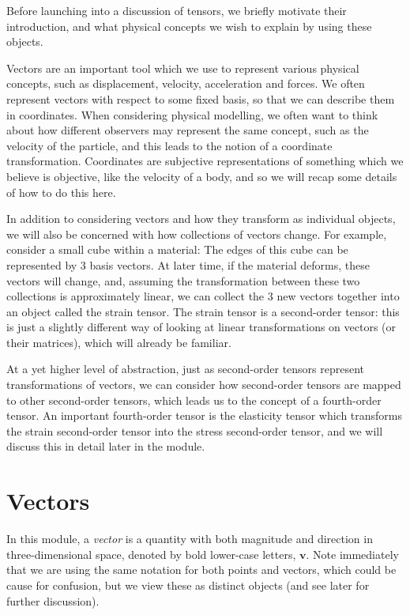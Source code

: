 \documentclass[
  letterpaper,
  DIV=11,
  numbers=noendperiod]{scrreprt}
\theoremstyle{plain}
\theoremstyle{remark}
\begin{document}
Before launching into a discussion of tensors, we briefly motivate their
introduction, and what physical concepts we wish to explain by using
these objects.

Vectors are an important tool which we use to represent various physical
concepts, such as displacement, velocity, acceleration and forces. We
often represent vectors with respect to some fixed basis, so that we can
describe them in coordinates. When considering physical modelling, we
often want to think about how different observers may represent the same
concept, such as the velocity of the particle, and this leads to the
notion of a coordinate transformation. Coordinates are subjective
representations of something which we believe is objective, like the
velocity of a body, and so we will recap some details of how to do this
here.

In addition to considering vectors and how they transform as individual
objects, we will also be concerned with how collections of vectors
change. For example, consider a small cube within a material: The edges
of this cube can be represented by 3 basis vectors. At later time, if
the material deforms, these vectors will change, and, assuming the
transformation between these two collections is approximately linear, we
can collect the 3 new vectors together into an object called the strain
tensor. The strain tensor is a second-order tensor: this is just a
slightly different way of looking at linear transformations on vectors
(or their matrices), which will already be familiar.

At a yet higher level of abstraction, just as second-order tensors
represent transformations of vectors, we can consider how second-order
tensors are mapped to other second-order tensors, which leads us to the
concept of a fourth-order tensor. An important fourth-order tensor is
the elasticity tensor which transforms the strain second-order tensor
into the stress second-order tensor, and we will discuss this in detail
later in the module.

\section{Vectors}\label{vectors}

In this module, a \emph{vector} is a quantity with both magnitude and
direction in three-dimensional space, denoted by bold lower-case
letters, \({\boldsymbol{v}}\). Note immediately that we are using the
same notation for both points and vectors, which could be cause for
confusion, but we view these as distinct objects (and see later for
further discussion).
\end{document}
